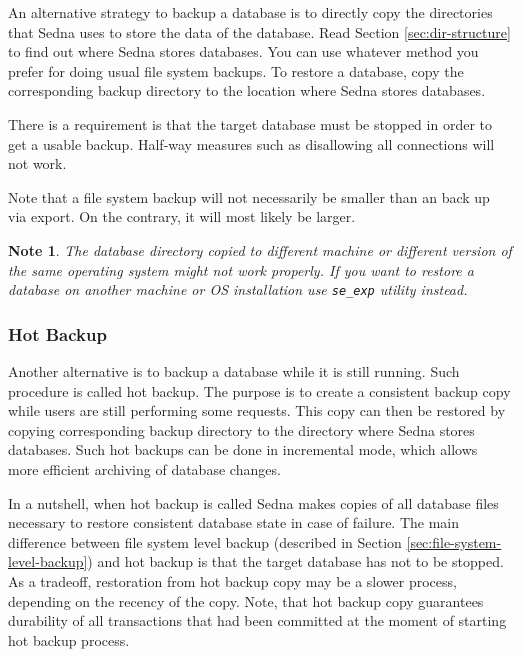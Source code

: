\documentclass[a4paper,12pt]{article}
\newtheorem{note}{Note}    %
\begin{document}
An alternative strategy to backup a database is to directly copy the directories
that Sedna uses to store the data of the database. Read Section
\ref{sec:dir-structure} to find out where Sedna stores databases. You can use
whatever method you prefer for doing usual file system backups. To restore a
database, copy the corresponding backup directory to the location where Sedna
stores databases.

There is a requirement is that the target database must be stopped in order to
get a usable backup. Half-way measures such as disallowing all connections will
not work.

Note that a file system backup will not necessarily be smaller than an back up
via export. On the contrary, it will most likely be larger.

\begin{note}
The database directory copied to different machine or different version of the
same operating system might not work properly. If you want to restore a database
on another machine or OS installation use \verb!se_exp! utility instead.
\end{note}


\subsubsection{Hot Backup}

Another alternative is to backup a database while it is still running. Such
procedure is called hot backup. The purpose is to create a consistent backup
copy while users are still performing some requests. This copy can then be
restored by copying corresponding backup directory to the directory where Sedna
stores databases. Such hot backups can be done in incremental mode, which allows
more efficient archiving of database changes.

In a nutshell, when hot backup is called Sedna makes copies of all database
files necessary to restore consistent database state in case of failure. The
main difference between file system level backup (described in Section
\ref{sec:file-system-level-backup}) and hot backup is that the target database
has not to be stopped. As a tradeoff, restoration from hot backup copy may be a
slower process, depending on the recency of the copy. Note, that hot backup copy
guarantees durability of all transactions that had been committed at the moment
of starting hot backup process.
\end{document}
